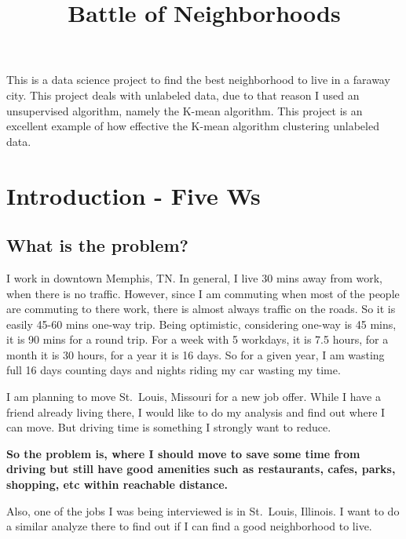 \documentclass[11pt]{article}
\title{Battle of Neighborhoods}
\begin{document}
    
    
    \maketitle
    
This is a data science project to find the best neighborhood to live in a faraway city. This project deals with unlabeled data, due to that reason I used an unsupervised algorithm, namely the K-mean algorithm. This project is an excellent example of how effective the K-mean algorithm clustering unlabeled data.


\tableofcontents
\newpage



    \hypertarget{introduction---five-ws}{%
\section{Introduction - Five Ws}\label{introduction---five-ws}}

\hypertarget{what-is-the-problem}{%
\subsection{What is the problem?}\label{what-is-the-problem}}

\indent I work in downtown Memphis, TN. In general, I live 30 mins away from
work, when there is no traffic. However, since I am commuting when most
of the people are commuting to there work, there is almost always
traffic on the roads. So it is easily 45-60 mins one-way trip. Being
optimistic, considering one-way is 45 mins, it is 90 mins for a round
trip. For a week with 5 workdays, it is 7.5 hours, for a month it is 30
hours, for a year it is 16 days. So for a given year, I am wasting full
16 days counting days and nights riding my car wasting my time.

I am planning to move St.~Louis, Missouri for a new job offer. While I
have a friend already living there, I would like to do my analysis and
find out where I can move. But driving time is something I strongly want
to reduce.

\textbf{So the problem is, where I should move to save some time from
driving but still have good amenities such as restaurants, cafes, parks,
shopping, etc within reachable distance.}

Also, one of the jobs I was being interviewed is in St.~Louis, Illinois.
I want to do a similar analyze there to find out if I can find a good
neighborhood to live.
\end{document}
